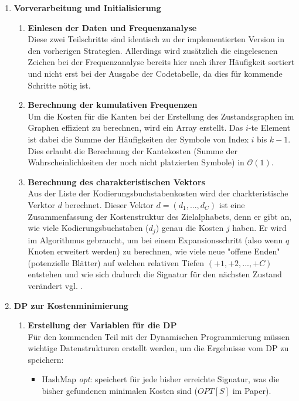 \documentclass[a4paper,10pt,ngerman]{scrartcl}
\begin{document}
\begin{enumerate}
  \item \textbf{Vorverarbeitung und Initialisierung}
  \begin{enumerate}
    \item \textbf{Einlesen der Daten und Frequenzanalyse}\\
    Diese zwei Teilschritte sind identisch zu der implementierten Version in den vorherigen Strategien. Allerdings wird zusätzlich die eingelesenen Zeichen bei der Frequenzanalyse bereits hier nach ihrer Häufigkeit sortiert und nicht erst bei der Ausgabe der Codetabelle, da dies für kommende Schritte nötig ist. 
    \item \textbf{Berechnung der kumulativen Frequenzen}\\
    Um die Kosten für die Kanten bei der Erstellung des Zustandsgraphen im Graphen effizient zu berechnen, wird ein Array erstellt. Das $i$-te Element ist dabei die Summe der Häufigkeiten der Symbole von Index $i$ bis $k-1$. Dies erlaubt die Berechnung der Kantekosten (Summe der Wahrscheinlichkeiten der noch nicht platzierten Symbole) in $\mathcal{O}(1)$. 
    \item \textbf{Berechnung des charakteristischen Vektors}\\
    Aus der Liste der Kodierungsbuchstabenkosten wird der charkteristische Verktor $d$ berechnet. Dieser Vektor $d=(d_1, ..., d_C)$ ist eine Zusammenfassung der Kostenstruktur des Zielalphabets, denn er gibt an, wie viele Kodierungsbuchstaben ($d_j$) genau die Kosten $j$ haben. Er wird im Algorithmus gebraucht, um bei einem Expansionsschritt (also wenn $q$ Knoten erweitert werden) zu berechnen, wie viele neue "offene Enden" (potenzielle Blätter) auf welchen relativen Tiefen $(+1, +2, ..., +C)$ entstehen und wie sich dadurch die Signatur für den nächsten Zustand verändert vgl. \cite[Lemma 3]{papergolinrote}.
  \end{enumerate}
  \item \textbf{DP zur Kostenminimierung}
  \begin{enumerate}
    \item \textbf{Erstellung der Variablen für die DP}\\
    Für den kommenden Teil mit der Dynamischen Programmierung müssen wichtige Datenstrukturen erstellt werden, um die Ergebnisse vom DP zu speichern: 
    \begin{itemize}
      \item HashMap \textit{opt}: speichert für jede bisher erreichte Signatur, was die bisher gefundenen minimalen Kosten sind ($OPT[S]$ im Paper).

\end{itemize}
\end{enumerate}
\end{enumerate}
\end{document}
